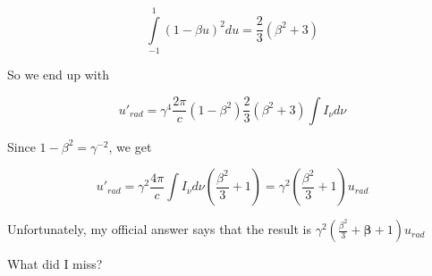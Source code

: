 \documentclass {article}
\begin{document}
   $$ \int\limits_{-1}^{1}\left(1-\beta u\right)^2du = \frac{2}{3}\left(\beta^2+3\right) $$ 
   
   So we end up with 
   
   $$ u'_{rad} = \gamma^4\frac{2\pi}{c}(1-\beta^2)\frac{2}{3}\left(\beta^2+3\right)\int I_\nu d\nu $$
   
    Since $1-\beta^2 = \gamma^{-2}$, we get 
    
    $$ u'_{rad} = \gamma^2\frac{4\pi}{c}\int I_\nu d\nu\left(\frac{\beta^2}{3}+1\right) = \gamma^2\left(\frac{\beta^2}{3}+1\right)u_{rad} $$ 
    
    Unfortunately, my official answer says that the result is $\gamma^2\left(\frac{\beta^2}{3}+\pmb{\beta}+1\right)u_{rad}$

What did I miss?
\end{document}
